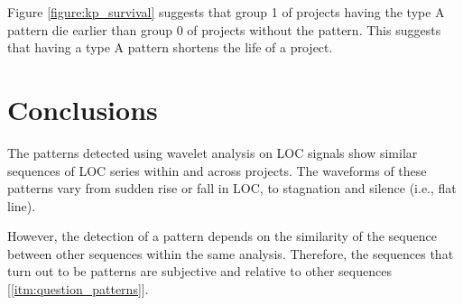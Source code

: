 

\noindent
Figure \ref{figure:kp_survival} suggests that group 1 of projects having the
type A pattern die earlier than group 0 of projects without the pattern. This
suggests that having a type A pattern shortens the life of a project.

\begin{comment}
\paragraph{}
The four patterns with the most common maximum LOC differences are shown in
Figure \ref{figure:top_patterns_plots} to illustrate how such patterns look
like. The figure depicts the wavelets of the patterns for all the project
signals they were detected in. Which are the differences in LOC values between
two subsequent coefficients.



The graphs show that the sequences have similar waveforms. Each graph contains
a multiple of plotted sequences: pattern 1 contains 216 sequences; pattern 2
contains 156 sequences; pattern 3 contains 151 sequences; and pattern 4 contains
141 sequences. Note that the factor of scale is reintroduced, because the
sequences all contain scale/filter coefficients. The factor of time, however,
is still being eliminated, hence the use of \emph{index }\rm instead of a time
metric on the horizontal axis.
\end{comment}

\section{Conclusions}

The patterns detected using wavelet analysis on LOC signals show similar
sequences of LOC series within and across projects. The waveforms of these
patterns vary from sudden rise or fall in LOC, to stagnation and silence (i.e.,
flat line).

However, the detection of a pattern depends on the similarity of the sequence
between other sequences within the same analysis. Therefore, the sequences that
turn out to be patterns are subjective and relative to other sequences
[\ref{itm:question_patterns}].

